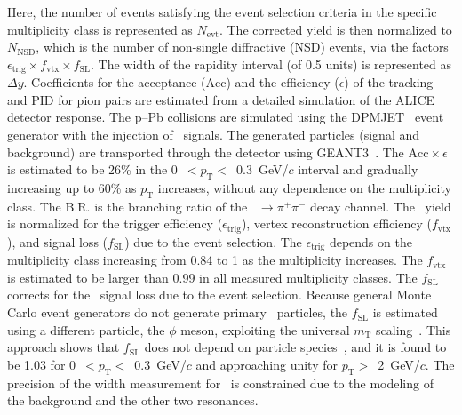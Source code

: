 Here, the number of events satisfying the event selection criteria in the specific multiplicity class is represented as $N_{\mathrm{evt}}$. The corrected yield is then normalized to $N_{\mathrm{NSD}}$, which is the number of non-single diffractive (NSD) events, via the factors $\epsilon_{\mathrm{trig}} \times f_{\mathrm{vtx}} \times f_{\mathrm{SL}}$. The width of the rapidity interval (of 0.5 units) is represented as $\Delta y$. Coefficients for the acceptance ($\mathrm{Acc}$) and the efficiency ($\epsilon$) of the tracking and PID for pion pairs are estimated from a detailed simulation of the ALICE detector response. The p--Pb collisions are simulated using the DPMJET~\cite{Fedynitch:2015kcn} event generator with the injection of \fzero~signals. The generated particles (signal and background) are transported through the detector using GEANT3~\cite{Brun:1994aa}. The $\mathrm{Acc}\times\epsilon$ is estimated to be 26\% in the 0~$<p_{\mathrm{T}}<$~0.3~GeV/$c$ interval and gradually increasing up to 60\% as $p_{\mathrm{T}}$ increases, without any dependence on the multiplicity class. The $\mathrm{B.R.}$ is the branching ratio of the \fzero~$\rightarrow \pi^{+}\pi^{-}$ decay channel. The \fzero~yield is normalized for the trigger efficiency ($\epsilon_{\mathrm{trig}}$), vertex reconstruction efficiency ($f_{\mathrm{vtx}}$), and signal loss ($f_{\mathrm{SL}}$) due to the event selection. The $\epsilon_{\mathrm{trig}}$ depends on the multiplicity class increasing from 0.84 to 1 as the multiplicity increases. The $f_{\mathrm{vtx}}$ is estimated to be larger than 0.99 in all measured multiplicity classes. The $f_{\mathrm{SL}}$ corrects for the \fzero~signal loss due to the event selection. Because general Monte Carlo event generators do not generate primary \fzero~particles, the $f_{\mathrm{SL}}$ is estimated using a different particle, the $\phi$ meson, exploiting the universal $m_{\mathrm{T}}$ scaling~\cite{Altenkamper:2017qot}. This approach shows that $f_{\mathrm{SL}}$ does not depend on particle species~\cite{ALICE:2019xyr}, and it is found to be 1.03 for 0~$<p_{\mathrm{T}}<$~0.3~GeV/$c$ and approaching unity for $p_{\mathrm{T}}>$~2~GeV/$c$. The precision of the width measurement for \fzero~is constrained due to the modeling of the background and the other two resonances.

